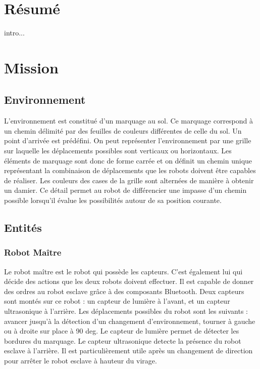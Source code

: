  \section{R\'{e}sum\'{e}}

 intro...

 \section{Mission}

  \subsection{Environnement}
  L'environnement est constitu\'{e} d'un marquage au sol. Ce marquage
  correspond \`{a} un chemin d\'{e}limit\'{e} par des feuilles de couleurs
  diff\'{e}rentes de celle du sol. Un point d'arriv\'{e}e est pr\'{e}d\'{e}fini. On peut
  repr\'{e}senter l'environnement par une grille sur laquelle les
  d\'{e}placements possibles sont verticaux ou horizontaux. Les \'{e}l\'{e}ments de
  marquage sont donc de forme carr\'{e}e et on d\'{e}finit un chemin unique
  repr\'{e}sentant la combinaison de d\'{e}placements que les robots doivent
  \^{e}tre capables de r\'{e}aliser. Les couleurs des cases de la grille sont
  altern\'{e}es de mani\`{e}re \`{a} obtenir un damier. Ce d\'{e}tail permet au robot de
  diff\'{e}rencier une impasse d'un chemin possible lorsqu'il \'{e}value les
  possibilit\'{e}s autour de sa position courante.

  \subsection{Entit\'{e}s}

   \subsubsection{Robot Ma\^{i}tre}
   Le robot ma\^{i}tre est le robot qui poss\`{e}de les capteurs. C'est
   \'{e}galement lui qui d\'{e}cide des actions que les deux robots doivent
   effectuer. Il est capable de donner des ordres au robot esclave
   gr\^{a}ce \`{a} des composants Bluetooth. Deux capteurs sont mont\'{e}s sur
   ce robot : un capteur de lumi\`{e}re \`{a} l'avant, et un capteur
   ultrasonique \`{a} l'arri\`{e}re. Les d\'{e}placements possibles du robot sont
   les suivants : avancer jusqu'\`{a} la d\'{e}tection d'un changement
   d'environnement, tourner \`{a} gauche ou \`{a} droite sur place \`{a}
   90 deg. Le
   capteur de lumi\`{e}re permet de d\'{e}tecter les bordures du marquage. Le
   capteur ultrasonique detecte la pr\'{e}sence du robot esclave \`{a}
   l'arri\`{e}re. Il est particuli\`{e}rement utile apr\`{e}s un changement de
   direction pour arr\^{e}ter le robot esclave \`{a} hauteur du virage. 

